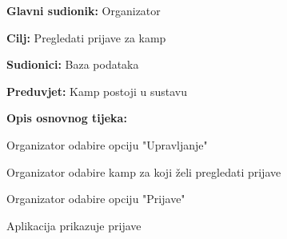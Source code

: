 				
					\noindent {}
					\begin{packed_item}
						
						\item \textbf{Glavni sudionik: } Organizator
						\item  \textbf{Cilj:} Pregledati prijave za kamp
						\item  \textbf{Sudionici:} Baza podataka
						\item  \textbf{Preduvjet:} Kamp postoji u sustavu
						\item  \textbf{Opis osnovnog tijeka:}
						
						\item[] \begin{packed_enum}
							\item Organizator odabire opciju "Upravljanje"
							\item Organizator odabire kamp za koji želi pregledati prijave
							\item Organizator odabire opciju "Prijave"
							\item Aplikacija prikazuje prijave 
						\end{packed_enum}								
					\end{packed_item}
				
